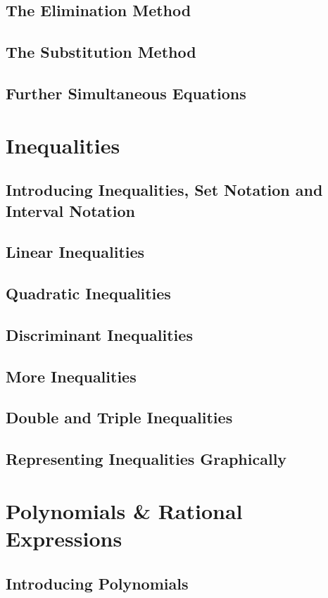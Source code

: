 \documentclass[../maths.tex]{subfiles}
\begin{document}
\subsection*{The Elimination Method}
\subsection*{The Substitution Method}
\subsection*{Further Simultaneous Equations}
\section{Inequalities}
\subsection*{Introducing Inequalities, Set Notation and Interval Notation}
\subsection*{Linear Inequalities}
\subsection*{Quadratic Inequalities}
\subsection*{Discriminant Inequalities}
\subsection*{More Inequalities}
\subsection*{Double and Triple Inequalities}
\subsection*{Representing Inequalities Graphically}
\section{Polynomials \& Rational Expressions}
\subsection*{Introducing Polynomials}
\end{document}
